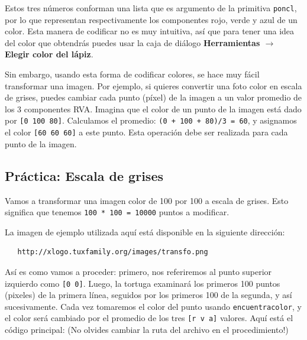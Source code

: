 Estos tres n\'umeros conforman una lista que es argumento de la primitiva
\texttt{poncl}, por lo que representan respectivamente los componentes
rojo, verde y azul de un color. Esta manera de codificar no es muy
intuitiva, as\'i que para tener una idea del color que obtendr\'as puedes
usar la caja de di\'alogo \textbf{Herramientas $\rightarrow$ Elegir color del l\'apiz}.

Sin embargo, usando esta forma de codificar colores, se hace muy f\'acil
transformar una imagen. Por ejemplo, si quieres convertir una foto color
en escala de grises, puedes cambiar cada punto (p\'ixel) de la imagen a un
valor promedio de los 3 componentes RVA. Imagina que el color de un punto
de la imagen est\'a dado por \texttt{[0 100 80]}. Calculamos el
promedio: \texttt{(0 + 100 + 80)/3 = 60}, y asignamos el color
\texttt{[60~60~60]} a este punto. Esta operaci\'on debe ser realizada para
cada punto de la imagen.

\subsection{Pr\'actica: Escala de grises}
   \label{Colores-Practica}

Vamos a transformar una imagen color de 100 por 100 a escala de
grises. Esto significa que tenemos \texttt{100 * 100 = 10000} puntos a
modificar.

La imagen de ejemplo utilizada aqu\'i est\'a disponible en la siguiente
direcci\'on:
\begin{verbatim}
   http://xlogo.tuxfamily.org/images/transfo.png \end{verbatim}
As\'i es como vamos a proceder: primero, nos referiremos al punto superior
izquierdo como \texttt{[0~0]}. Luego, la tortuga examinar\'a los
primeros 100 puntos (pixeles) de la primera l\'inea, seguidos por los
primeros 100 de la segunda, y as\'i sucesivamente. Cada vez tomaremos
el color del punto usando \texttt{encuentracolor}, y el color ser\'a cambiado
por el promedio de los tres \texttt{[r~v~a]} valores. Aqu\'i est\'a
el c\'odigo principal: (No olvides cambiar la ruta del archivo en el
procedimiento!)

